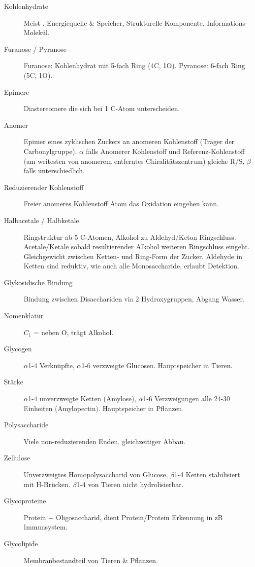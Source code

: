 \documentclass[a4paper,twocolumn,usegeometry,english,fontsize=6,DIV=16]{scrartcl}
\begin{document}
\begin{description}
	\item[Kohlenhydrate] Meist . Energiequelle \& Speicher,
		Strukturelle Komponente, Informations-Molekül.
	\item[Furanose / Pyranose] Furanose: Kohlenhydrat mit 5-fach Ring (4C, 1O).
		Pyranose: 6-fach Ring (5C, 1O).
	\item[Epimere] Diastereomere die sich bei 1 C-Atom unterscheiden.
	\item[Anomer] Epimer eines zyklischen Zuckers an anomeren Kohlenstoff
		(Träger der Carbonylgruppe). $\alpha$ falls Anomerer
		Kohlenstoff und Referenz-Kohlenstoff (am weitesten von anomerem
		entferntes Chiralitätszentrum) gleiche R/S, $\beta$ falls
		unterschiedlich.
	\item[Reduzierender Kohlenstoff] Freier anomeres Kohlenstoff Atom das
		Oxidation eingehen kann.
	\item[Halbacetale / Halbketale] Ringstruktur ab 5 C-Atomen, Alkohol zu
		Aldehyd/Keton Ringschluss. Acetale/Ketale sobald resultierender
		Alkohol weiteren Ringschluss eingeht. Gleichgewicht zwischen
		Ketten- und Ring-Form der Zucker. Aldehyde in Ketten sind
		reduktiv, wie auch alle Monosaccharide, erlaubt Detektion.
	\item[Glykosidische Bindung] Bindung zwischen Disacchariden via 2
		Hydroxygruppen, Abgang Wasser.
	\item[Nomenklatur] $C_1$ = neben O, trägt Alkohol.
	\item[Glycogen] $\alpha$1-4 Verknüpfte, $\alpha$1-6 verzweigte
		Glucosen. Hauptspeicher in Tieren.
	\item[Stärke] $\alpha$1-4 unverzweigte Ketten (Amylose), $\alpha$1-6
		Verzweigungen alle 24-30 Einheiten (Amylopectin). Hauptspeicher
		in Pflanzen.
	\item[Polysaccharide] Viele non-reduzierenden Enden, gleichzeitiger Abbau.
	\item[Zellulose] Unverzweigtes Homopolysaccharid von Glucose,
		$\beta$1-4 Ketten stabilisiert mit H-Brücken. $\beta$1-4 von
		Tieren nicht hydrolisierbar.
	\item[Glycoproteine] Protein + Oligosaccharid, dient Protein/Protein
		Erkennung in zB Immunsystem.
	\item[Glycolipide] Membranbestandteil von Tieren \& Pflanzen.
\end{description}
\end{document}
